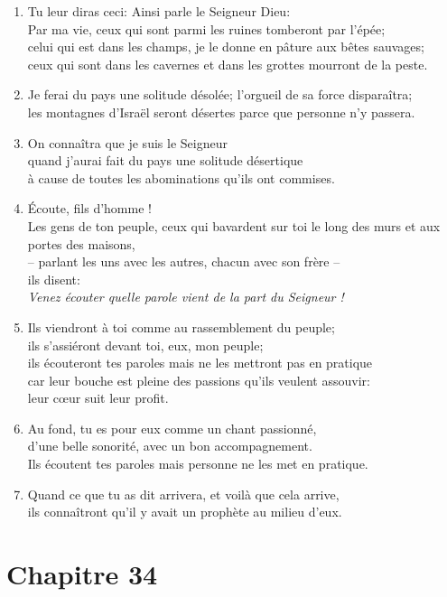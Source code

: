 \documentclass[12pt,a4paper,titlepage]{article}
\def \pslabelsep{0.2em} %
\def \psleftmargin{0em} %
\begin{document}
\begin{enumerate}[leftmargin=\psleftmargin, labelsep = \pslabelsep, label={\arabic*}, font=\color{\pscolor}\small\textsuperscript, parsep=0em, itemsep=0em, topsep=0em ]
\item Tu leur diras ceci: Ainsi parle le Seigneur Dieu: \\ Par ma vie, ceux qui sont parmi les ruines tomberont par l’épée; \\ celui qui est dans les champs, je le donne en pâture aux bêtes sauvages; \\ ceux qui sont dans les cavernes et dans les grottes mourront de la peste.
\item Je ferai du pays une solitude désolée; l’orgueil de sa force disparaîtra; \\ les montagnes d’Israël seront désertes parce que personne n’y passera.
\item On connaîtra que je suis le Seigneur \\ quand j’aurai fait du pays une solitude désertique \\ à cause de toutes les abominations qu’ils ont commises.
\newpage
\item Écoute, fils d’homme ! \\ Les gens de ton peuple, ceux qui bavardent sur toi le long des murs et aux portes des maisons, \\– parlant les uns avec les autres, chacun avec son frère – \\ ils disent: \\ \decalage \og{}\emph{Venez écouter quelle parole vient de la part du Seigneur !}\fg{} \verseSpace
\item Ils viendront à toi comme au rassemblement du peuple; \\ ils s’assiéront devant toi, eux, mon peuple; \\ ils écouteront tes paroles mais ne les mettront pas en pratique \\ car leur bouche est pleine des passions qu’ils veulent assouvir: \\ leur cœur suit leur profit. \verseSpace
\item Au fond, tu es pour eux comme un chant passionné, \\ d’une belle sonorité, avec un bon accompagnement. \\ Ils écoutent tes paroles mais personne ne les met en pratique. \verseSpace
\item Quand ce que tu as dit arrivera, et voilà que cela arrive,\\ ils connaîtront qu’il y avait un prophète au milieu d’eux.
\end{enumerate}
\newpage

\section*{Chapitre 34}
\end{document}
